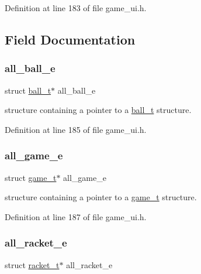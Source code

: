 Definition at line 183 of file game\+\_\+ui.\+h.



\subsection{Field Documentation}
\mbox{\label{structall__t_a8d2313689132a052d5e697ed96c267b3}} 
\subsubsection{\texorpdfstring{all\+\_\+ball\+\_\+e}{all\_ball\_e}}
{\footnotesize\ttfamily struct \hyperlink{structball__t}{ball\+\_\+t}$\ast$ all\+\_\+ball\+\_\+e}

structure containing a pointer to a \hyperlink{structball__t}{ball\+\_\+t} structure. 

Definition at line 185 of file game\+\_\+ui.\+h.

\mbox{\label{structall__t_af9c1a9096cf652aa5b37d4cc768dcd70}} 
\subsubsection{\texorpdfstring{all\+\_\+game\+\_\+e}{all\_game\_e}}
{\footnotesize\ttfamily struct \hyperlink{structgame__t}{game\+\_\+t}$\ast$ all\+\_\+game\+\_\+e}

structure containing a pointer to a \hyperlink{structgame__t}{game\+\_\+t} structure. 

Definition at line 187 of file game\+\_\+ui.\+h.

\mbox{\label{structall__t_a4857ea3a6650aa37b82c0e7336eaa278}} 
\subsubsection{\texorpdfstring{all\+\_\+racket\+\_\+e}{all\_racket\_e}}
{\footnotesize\ttfamily struct \hyperlink{structracket__t}{racket\+\_\+t}$\ast$ all\+\_\+racket\+\_\+e}

